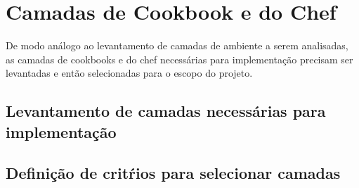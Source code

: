 \section{Camadas de Cookbook e do Chef}
De modo análogo ao levantamento de camadas de ambiente a serem analisadas, as camadas de cookbooks e do chef necessárias para implementação precisam ser levantadas e então selecionadas para o escopo do projeto.

\subsection{Levantamento de camadas necessárias para implementação}

\subsection{Definição de critŕios para selecionar camadas}

